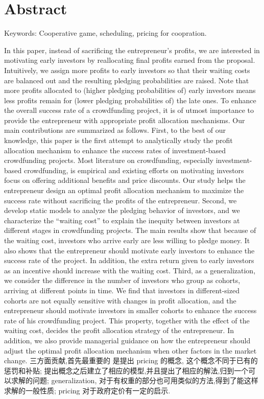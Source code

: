 \section*{Abstract}



Keywords: Cooperative game, scheduling, pricing for coopration.


In this paper, instead of sacrificing the entrepreneur’s profits, we are interested in motivating early investors by reallocating final profits earned from the proposal. Intuitively, we assign more profits to early investors so that their waiting costs are balanced out and the resulting pledging probabilities are raised. Note that more profits allocated to (higher pledging probabilities of) early investors means less profits remain for (lower pledging probabilities of) the late ones. To enhance the overall success rate of a crowdfunding project, it is of utmost importance to provide the entrepreneur with appropriate profit allocation mechanisms. Our main contributions are summarized as follows.
First, to the best of our knowledge, this paper is the first attempt to analytically study the profit
allocation mechanism to enhance the success rates of investment-based crowdfunding projects. Most
literature on crowdfunding, especially investment-based crowdfunding, is empirical and existing efforts
on motivating investors focus on offering additional benefits and price discounts. Our study helps the entrepreneur design an optimal profit allocation mechanism to maximize the success rate without sacrificing the profits of the entrepreneur.
Second, we develop static models to analyze the pledging behavior of investors, and we characterize
the “waiting cost” to explain the inequity between investors at different stages in crowdfunding projects. The main results show that because of the waiting cost, investors who arrive early are less willing to pledge money. It also shows that the entrepreneur should motivate early investors to enhance the success rate of the project. In addition, the extra return given to early investors as an incentive should increase with the waiting cost.
Third, as a generalization, we consider the difference in the number of investors who group as cohorts, arriving at different points in time. We find that investors in different-sized cohorts are not equally sensitive with changes in profit allocation, and the entrepreneur should motivate investors in smaller cohorts to enhance the success rate of his crowdfunding project. This property, together with the effect of the waiting cost, decides the profit allocation strategy of the entrepreneur. In addition, we also provide managerial guidance on how the entrepreneur should adjust the optimal profit allocation mechanism when other factors in the market change.
三方面贡献,首先最重要的 是提出 pricing 的概念, 这个概念不同于已有的 惩罚和补贴; 提出概念之后建立了相应的模型,并且提出了相应的解法,归到一个可以求解的问题; generalization, 对于有权重的部分也可用类似的方法,得到了能这样求解的一般性质;
pricing 对于政府定价有一定的启示.

